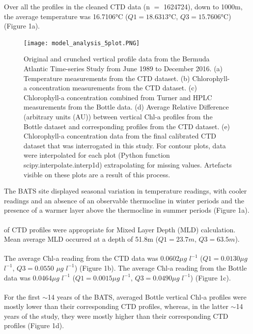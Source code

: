 \documentclass{article}
\begin{document}
Over all the profiles in the cleaned CTD data (n $=$ 1624724), down to 1000m, the average temperature was 16.7106°C ($Q1 = 18.6313$°C, $Q3 = 15.7606$°C) (Figure 1a).
\begin{figure}[ht!]
\begin{center}
      \texttt{[image: model\_analysis\_5plot.PNG]}
\end{center}
\caption{Original and crunched vertical profile data from the Bermuda Atlantic Time-series Study from June 1989 to December 2016. (a) Temperature measurements from the CTD dataset. (b) Chlorophyll-a concentration measurements from the CTD dataset. (c) Chlorophyll-a concentration combined from Turner and HPLC measurements from the Bottle data. (d) Average Relative Difference (arbitrary units (AU)) between vertical Chl-a profiles from the Bottle dataset and corresponding profiles from the CTD dataset. (e) Chlorophyll-a concentration data from the final calibrated CTD dataset that was interrogated in this study. For contour plots, data were interpolated for each plot (Python function scipy.interpolate.interp1d) extrapolating for missing values. Artefacts visible on these plots are a result of this process.}
\end{figure}
\noindent
The BATS site displayed seasonal variation in temperature readings, with cooler readings and an absence of an observable thermocline in winter periods and the presence of a warmer layer above the thermocline in summer periods (Figure 1a).\\ \\
 of CTD profiles were appropriate for Mixed Layer Depth (MLD) calculation. Mean average MLD occurred at a depth of 51.8m ($Q1 = 23.7m$, $Q3 = 63.5m$). \\ \\
\noindent
The average Chl-a reading from the CTD data was 0.0602$\mu g$ $l ^{-1}$ ($Q1 = 0.0130\mu g$ $l ^{-1}$, $Q3 = 0.0550$ $\mu g$ $l ^{-1}$) (Figure 1b). The average Chl-a reading from the Bottle data was 0.0464$\mu g$ $l ^{-1}$ ($Q1 = 0.0015$$\mu g$ $l ^{-1}$, $Q3 = 0.0490$$\mu g$ $l ^{-1}$) (Figure 1c).\\ \\
\noindent
For the first $\sim$14 years of the BATS, averaged Bottle vertical Chl-a profiles were mostly lower than their corresponding CTD profiles, whereas, in the latter $\sim$14 years of the study, they were mostly higher than their corresponding CTD profiles (Figure 1d).\\ \\
\noindent
\end{document}
